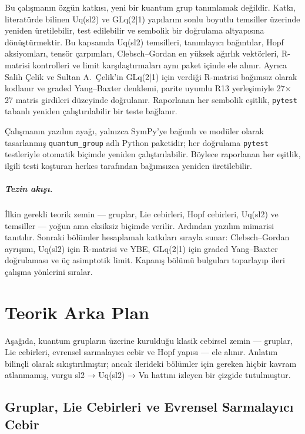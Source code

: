 \documentclass[12pt,a4paper]{report}
\numberwithin{equation}{chapter}
\theoremstyle{plain}
\theoremstyle{definition}
\begin{document}
Bu çalışmanın özgün katkısı, yeni bir kuantum grup tanımlamak değildir.
Katkı, literatürde bilinen Uq(sl2) ve GLq(2|1) yapılarını sonlu boyutlu
temsiller üzerinde yeniden üretilebilir, test edilebilir ve sembolik bir
doğrulama altyapısına dönüştürmektir. Bu kapsamda Uq(sl2) temsilleri, tanımlayıcı
bağıntılar, Hopf aksiyomları, tensör çarpımları, Clebsch--Gordan en yüksek
ağırlık vektörleri, R-matrisi kontrolleri ve limit karşılaştırmaları aynı
paket içinde ele alınır. Ayrıca Salih Çelik ve Sultan A.\ Çelik'in
GLq(2|1) için verdiği R-matrisi bağımsız olarak kodlanır ve graded
Yang--Baxter denklemi, parite uyumlu R13 yerleşimiyle 27× 27
matris girdileri düzeyinde doğrulanır. Raporlanan her sembolik eşitlik,
\texttt{pytest} tabanlı yeniden çalıştırılabilir bir teste bağlanır.

Çalışmanın yazılım ayağı, yalnızca SymPy'ye bağımlı ve modüler olarak
tasarlanmış \texttt{quantum\_group} adlı Python paketidir; her doğrulama
\texttt{pytest} testleriyle otomatik biçimde yeniden çalıştırılabilir. Böylece raporlanan her eşitlik, ilgili
testi koşturan herkes tarafından bağımsızca yeniden üretilebilir.

\paragraph{Tezin akışı.} İlkin gerekli teorik zemin --- gruplar, Lie
cebirleri, Hopf cebirleri, Uq(sl2) ve temsiller --- yoğun ama eksiksiz biçimde
verilir. Ardından yazılım mimarisi tanıtılır. Sonraki bölümler hesaplamalı
katkıları sırayla sunar: Clebsch--Gordan ayrışımı, Uq(sl2) için R-matrisi ve
YBE, GLq(2|1) için graded Yang--Baxter doğrulaması ve üç asimptotik limit.
Kapanış bölümü bulguları toparlayıp ileri çalışma yönlerini sıralar.

\chapter{Teorik Arka Plan}

Aşağıda, kuantum grupların üzerine kurulduğu klasik cebirsel zemin --- gruplar,
Lie cebirleri, evrensel sarmalayıcı cebir ve Hopf yapısı --- ele alınır.
Anlatım bilinçli olarak sıkıştırılmıştır; ancak ilerideki bölümler için gereken
hiçbir kavram atlanmamış, vurgu sl2 → Uq(sl2) → Vn hattını izleyen bir
çizgide tutulmuştur.

\section{Gruplar, Lie Cebirleri ve Evrensel Sarmalayıcı Cebir}
\end{document}
